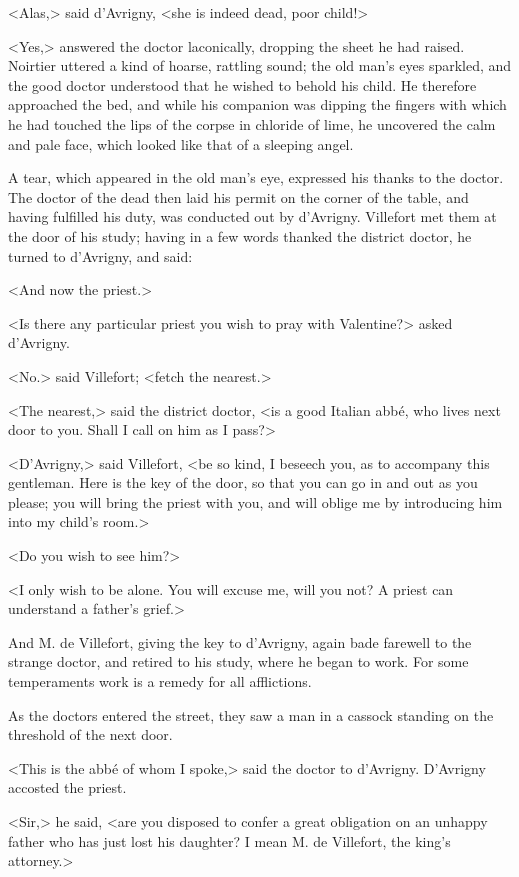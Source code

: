  <Alas,> said d'Avrigny, <she is indeed dead, poor child!>

<Yes,> answered the doctor laconically, dropping the sheet he had raised. Noirtier uttered a kind of hoarse, rattling sound; the old man's eyes sparkled, and the good doctor understood that he wished to behold his child. He therefore approached the bed, and while his companion was dipping the fingers with which he had touched the lips of the corpse in chloride of lime, he uncovered the calm and pale face, which looked like that of a sleeping angel. 

 A tear, which appeared in the old man's eye, expressed his thanks to the doctor. The doctor of the dead then laid his permit on the corner of the table, and having fulfilled his duty, was conducted out by d'Avrigny. Villefort met them at the door of his study; having in a few words thanked the district doctor, he turned to d'Avrigny, and said: 

 <And now the priest.> 

 <Is there any particular priest you wish to pray with Valentine?> asked d'Avrigny. 

 <No.> said Villefort; <fetch the nearest.> 

 <The nearest,> said the district doctor, <is a good Italian abbé, who lives next door to you. Shall I call on him as I pass?> 

 <D'Avrigny,> said Villefort, <be so kind, I beseech you, as to accompany this gentleman. Here is the key of the door, so that you can go in and out as you please; you will bring the priest with you, and will oblige me by introducing him into my child's room.>

<Do you wish to see him?> 

 <I only wish to be alone. You will excuse me, will you not? A priest can understand a father's grief.> 

 And M. de Villefort, giving the key to d'Avrigny, again bade farewell to the strange doctor, and retired to his study, where he began to work. For some temperaments work is a remedy for all afflictions. 

 As the doctors entered the street, they saw a man in a cassock standing on the threshold of the next door. 

 <This is the abbé of whom I spoke,> said the doctor to d'Avrigny. D'Avrigny accosted the priest. 

 <Sir,> he said, <are you disposed to confer a great obligation on an unhappy father who has just lost his daughter? I mean M. de Villefort, the king's attorney.> 

